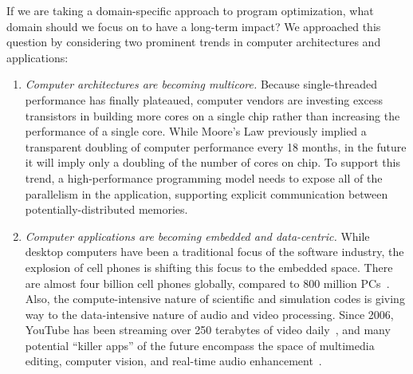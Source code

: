 If we are taking a domain-specific approach to program optimization,
what domain should we focus on to have a long-term impact?  We
approached this question by considering two prominent trends in
computer architectures and applications:

\begin{enumerate}

\item {\it Computer architectures are becoming multicore.}  Because
  single-threaded performance has finally plateaued, computer vendors
  are investing excess transistors in building more cores on a single
  chip rather than increasing the performance of a single core.  While
  Moore's Law previously implied a transparent doubling of computer
  performance every 18 months, in the future it will imply only a
  doubling of the number of cores on chip.  To support this trend, a
  high-performance programming model needs to expose all of the
  parallelism in the application, supporting explicit communication
  between potentially-distributed memories.

\item {\it Computer applications are becoming embedded and
  data-centric.}  While desktop computers have been a traditional
  focus of the software industry, the explosion of cell phones is
  shifting this focus to the embedded space.  There are almost four
  billion cell phones globally, compared to 800 million
  PCs~\cite{medford_microsoft/yahoo_2008}.  Also, the
  compute-intensive nature of scientific and simulation codes is
  giving way to the data-intensive nature of audio and video
  processing.  Since 2006, YouTube has been streaming over 250
  terabytes of video daily~\cite{watkins_mash_2006}, and many
  potential ``killer apps'' of the future encompass the space of
  multimedia editing, computer vision, and real-time audio
  enhancement~\cite{asanovic_landscape_2006,chen_convergence_2008}.

\end{enumerate}


